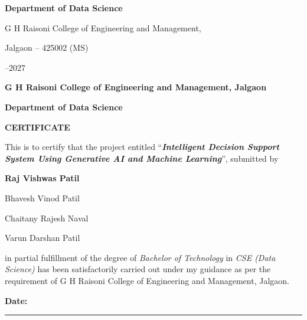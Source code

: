 \begin{titlepage}
\vfill
\vspace*{3cm}
\vfill
{\fontsize{12}{14}\selectfont\bfseries Department of Data Science\par}
{\fontsize{14}{17}\selectfont G H Raisoni College of Engineering and Management,\par}
{\fontsize{14}{17}\selectfont Jalgaon -- 425002 (MS)\par}
{\fontsize{14}{17}--2027\par}
\end{titlepage}

\pagestyle{idss}
\thispagestyle{collegeonly}
\begin{center}
\linespread{1}\selectfont
{\fontsize{16}{19}\selectfont\bfseries G H Raisoni College of Engineering and Management, Jalgaon\par}
\vspace{6pt}
{\fontsize{12}{14}\selectfont\bfseries Department of Data Science\par}
\vspace{30pt}
{\fontsize{20}{24}\selectfont\bfseries CERTIFICATE\par}
\end{center}
\vspace{18pt}
\noindent This is to certify that the project entitled ``\textbf{\textit{Intelligent Decision Support System Using Generative AI and Machine Learning}}'', submitted by\par
\vspace{6pt}
{\centering\linespread{1.3}\selectfont\bfseries
Raj Vishwas Patil\par
Bhavesh Vinod Patil\par
Chaitany Rajesh Naval\par
Varun Darshan Patil\par
}
\vspace{6pt}
\noindent in partial fulfillment of the degree of \textit{Bachelor of Technology} in \textit{CSE (Data Science)} has been satisfactorily carried out under my guidance as per the requirement of G H Raisoni College of Engineering and Management, Jalgaon.\par
\vspace{12pt}
\noindent\textbf{Date:} \rule{4.5cm}{0.4pt}\par

